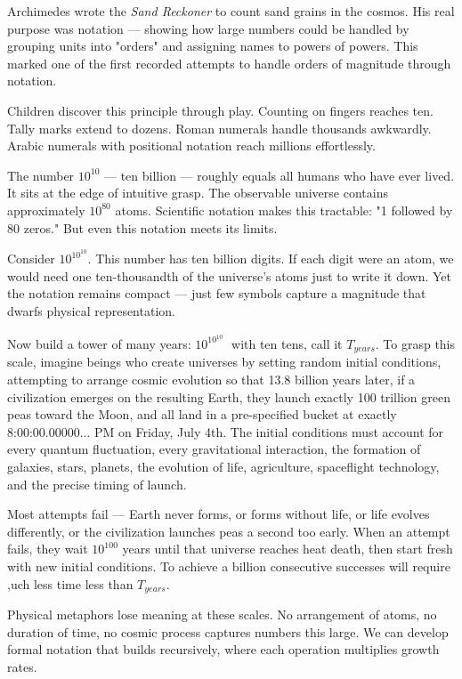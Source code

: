 Archimedes wrote the \emph{Sand Reckoner} to count sand grains in the cosmos. His real purpose was notation — showing how large numbers could be handled by grouping units into "orders" and assigning names to powers of powers. This marked one of the first recorded attempts to handle orders of magnitude through notation.

Children discover this principle through play. Counting on fingers reaches ten. Tally marks extend to dozens. Roman numerals handle thousands awkwardly. Arabic numerals with positional notation reach millions effortlessly.

The number $10^{10}$ — ten billion — roughly equals all humans who have ever lived. It sits at the edge of intuitive grasp. The observable universe contains approximately $10^{80}$ atoms. Scientific notation makes this tractable: "1 followed by 80 zeros." But even this notation meets its limits.

Consider $10^{10^{10}}$. This number has ten billion digits. If each digit were an atom, we would need one ten-thousandth of the universe's atoms just to write it down. Yet the notation remains compact — just few symbols capture a magnitude that dwarfs physical representation.

Now build a tower of many years: $10^{10^{10^{\cdot^{\cdot^{\cdot}}}}}$ with ten tens, call it $T_{years}$. To grasp this scale, imagine beings who create universes by setting random initial conditions, attempting to arrange cosmic evolution so that 13.8 billion years later, if a civilization emerges on the resulting Earth, they launch exactly 100 trillion green peas toward the Moon, and all land in a pre-specified bucket at exactly 8:00:00.00000... PM on Friday, July 4th. The initial conditions must account for every quantum fluctuation, every gravitational interaction, the formation of galaxies, stars, planets, the evolution of life, agriculture, spaceflight technology, and the precise timing of launch.

Most attempts fail — Earth never forms, or forms without life, or life evolves differently, or the civilization launches peas a second too early. When an attempt fails, they wait $10^{100}$ years until that universe reaches heat death, then start fresh with new initial conditions. To achieve a billion consecutive successes will require ,uch less time less than $T_{years}$.

Physical metaphors lose meaning at these scales. No arrangement of atoms, no duration of time, no cosmic process captures numbers this large. We can develop formal notation that builds recursively, where each operation multiplies growth rates.

